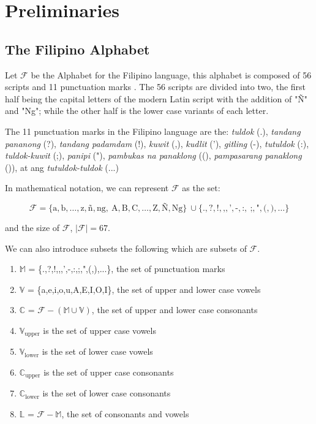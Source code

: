 \section{Preliminaries}
\subsection{The Filipino Alphabet}

Let \(\mathcal{F}\) be the Alphabet for the Filipino language, this alphabet is
composed of 56 scripts and 11 punctuation marks \cite{OOP}. The 56 scripts are divided into
two, the first half being the capital letters of the modern Latin script with
the addition of "Ñ" and "Ng"; while the other half is the lower case variants
of each letter.

The 11 punctuation marks in the Filipino language are the: \textit{tuldok} (.),
\textit{tandang pananong} (?), \textit{tandang padamdam} (!), \textit{kuwit} (,),
\textit{kudlit} ('), \textit{gitling} (-), \textit{tutuldok} (:),
\textit{tuldok-kuwit} (;), \textit{panipi} ("), \textit{pambukas na panaklong}
((), \textit{pampasarang panaklong} ()), at ang \textit{tutuldok-tuldok} (...)

In mathematical notation, we can represent \(\mathcal{F}\) as the set:

\[
    \mathcal{F} = \{\text{a},\text{b},\dots,\text{z},\text{ñ},\text{ng},   \
    \text{A},\text{B},\text{C},\dots,\text{Z},\text{Ñ},\text{Ng}\}         \
    \cup \{\text{.},\text{?},\text{!},\text{,},\text{'},\text{-},\text{:}, \
    \text{;},\text{"},\text{(},\text{)}, \ldots\}
\]

and the size of \(\mathcal{F}\), \(\left|\mathcal{F}\right| = 67\).

We can also introduce subsets the following which are subsets of \(\mathcal{F}\).
\begin{enumerate}
    \item \(\mathbb{M}\) = \{.,?,!,,,',-,:,;,",(,),...\}, the set of punctuation marks
    \item \(\mathbb{V}\) = \{a,e,i,o,u,A,E,I,O,I\}, the set of upper and lower case vowels
    \item \(\mathbb{C}\) = \(\mathcal{F} - (\mathbb{M}\cup\mathbb{V})\),
          the set of upper and lower case consonants
    \item \(\mathbb{V}_\text{upper}\) is the set of upper case vowels
    \item \(\mathbb{V}_\text{lower}\) is the set of lower case vowels
    \item \(\mathbb{C}_\text{upper}\) is the set of upper case consonants
    \item \(\mathbb{C}_\text{lower}\) is the set of lower case consonants
    \item \(\mathbb{L}\) = \(\mathcal{F} - \mathbb{M}\), the set of consonants and vowels
\end{enumerate}

